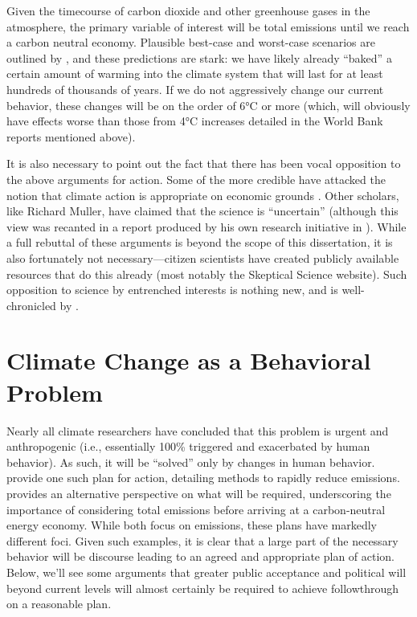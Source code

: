 Given the timecourse of carbon dioxide and other greenhouse gases in the
atmosphere, the primary variable of interest will be total emissions until we
reach a carbon neutral economy. Plausible best-case and worst-case scenarios are
outlined by \textcite{archer_millennial_2008}, and these predictions are stark:
we have likely already “baked” a certain amount of warming into the climate
system that will last for at least hundreds of thousands of years. If we do not
aggressively change our current behavior, these changes will be on the order of
6°C or more (which, will obviously have effects worse than those from 4°C
increases detailed in the World Bank reports mentioned above).

It is also necessary to point out the fact that there has been vocal opposition
to the above arguments for action. Some of the more credible have attacked the
notion that climate action is appropriate on economic grounds
\parencite[e.g.,][]{lomborg_cool_2007}. Other scholars, like Richard Muller,
have claimed that the science is “uncertain” (although this view was
recanted in a report produced by his own research initiative
in ). 
While a full rebuttal of these arguments is beyond the
scope of this dissertation, it is also fortunately not necessary---citizen
scientists have created publicly available resources that do this already (most
notably the Skeptical Science website).  Such opposition to science by
entrenched interests is nothing new, and is well-chronicled by
\textcite{oreskes_merchants_2010}.

\section{Climate Change as a Behavioral Problem}

Nearly all climate researchers have concluded that this problem is urgent and
anthropogenic (i.e., essentially 100\% triggered and exacerbated by human behavior). 
As such, it will be ``solved'' only by changes in human behavior.
\textcite{harte_cool_2008} provide one such plan for action, detailing methods
to rapidly reduce emissions. \textcite{schrag_hope_2011} provides an alternative
perspective on what will be required, underscoring the importance of considering
total emissions before arriving at a carbon-neutral energy economy. While both
focus on emissions, these plans have markedly different foci. Given such
examples, it is clear that a large part of the necessary behavior will be
discourse leading to an agreed and appropriate plan of action. Below, we'll see
some arguments that greater public acceptance and political will beyond
current levels will almost certainly be required to achieve followthrough on a
reasonable plan.

